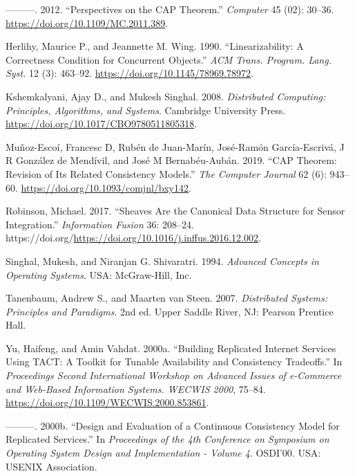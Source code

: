 \documentclass[]             %
{NASA}                       %
\newlength{\cslhangindent}
\newlength{\cslentryspacingunit} %
\newenvironment{CSLReferences}[2] %
 {%
  \setlength{\parindent}{0pt}
  \ifodd #1
  \let\oldpar\par
  \def\par{\hangindent=\cslhangindent\oldpar}
  \fi
  \setlength{\parskip}{#2\cslentryspacingunit}
 }%
 {}
\theoremstyle{definition}
\begin{document}
\begin{CSLReferences}{1}{0}
\leavevmode{}%
---------. 2012. {``Perspectives on the CAP Theorem.''} \emph{Computer}
45 (02): 30--36. \url{https://doi.org/10.1109/MC.2011.389}.

\leavevmode{}%
Herlihy, Maurice P., and Jeannette M. Wing. 1990. {``Linearizability: A
Correctness Condition for Concurrent Objects.''} \emph{ACM Trans.
Program. Lang. Syst.} 12 (3): 463--92.
\url{https://doi.org/10.1145/78969.78972}.

\leavevmode{}%
Kshemkalyani, Ajay D., and Mukesh Singhal. 2008. \emph{Distributed
Computing: Principles, Algorithms, and Systems}. Cambridge University
Press. \url{https://doi.org/10.1017/CBO9780511805318}.

\leavevmode{}%
Muñoz-Escoí, Francesc D, Rubén de Juan-Marín, José-Ramón García-Escrivá,
J R González de Mendívil, and José M Bernabéu-Aubán. 2019. {``CAP
Theorem: Revision of Its Related Consistency Models.''} \emph{The
Computer Journal} 62 (6): 943--60.
\url{https://doi.org/10.1093/comjnl/bxy142}.

\leavevmode{}%
Robinson, Michael. 2017. {``Sheaves Are the Canonical Data Structure for
Sensor Integration.''} \emph{Information Fusion} 36: 208--24.
https://doi.org/\url{https://doi.org/10.1016/j.inffus.2016.12.002}.

\leavevmode{}%
Singhal, Mukesh, and Niranjan G. Shivaratri. 1994. \emph{Advanced
Concepts in Operating Systems}. USA: McGraw-Hill, Inc.

\leavevmode{}%
Tanenbaum, Andrew S., and Maarten van Steen. 2007. \emph{Distributed
Systems: Principles and Paradigms}. 2nd ed. Upper Saddle River, NJ:
Pearson Prentice Hall.

\leavevmode{}%
Yu, Haifeng, and Amin Vahdat. 2000a. {``Building Replicated Internet
Services Using TACT: A Toolkit for Tunable Availability and Consistency
Tradeoffs.''} In \emph{Proceedings Second International Workshop on
Advanced Issues of e-Commerce and Web-Based Information Systems. WECWIS
2000}, 75--84. \url{https://doi.org/10.1109/WECWIS.2000.853861}.

\leavevmode{}%
---------. 2000b. {``Design and Evaluation of a Continuous Consistency
Model for Replicated Services.''} In \emph{{Proceedings of the 4th
Conference on Symposium on Operating System Design and Implementation -
Volume 4}}. OSDI'00. USA: USENIX Association.


\end{CSLReferences}
\end{document}
